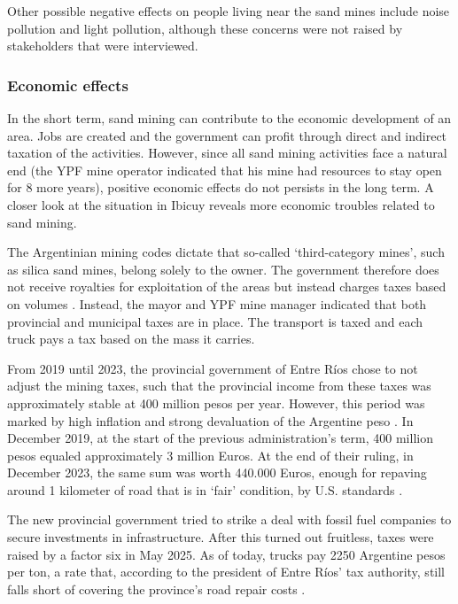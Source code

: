 Other possible negative effects on people living near the sand mines include noise pollution and light pollution, although these concerns were not raised by stakeholders that were interviewed.

\subsubsection{Economic effects}
In the short term, sand mining can contribute to the economic development of an area. Jobs are created and the government can profit through direct and indirect taxation of the activities. However, since all sand mining activities face a natural end (the YPF mine operator indicated that his mine had resources to stay open for 8 more years), positive economic effects do not persists in the long term. A closer look at the situation in Ibicuy reveals more economic troubles related to sand mining.

The Argentinian mining codes dictate that so-called `third-category mines', such as silica sand mines, belong solely to the owner. The government therefore does not receive royalties for exploitation of the areas but instead charges taxes based on volumes \autocite{novasImpactoAmbientalOculto2022}. Instead, the mayor and YPF mine manager indicated that both provincial and municipal taxes are in place. The transport is taxed and each truck pays a tax based on the mass it carries.

From 2019 until 2023, the provincial government of Entre Ríos chose to not adjust the mining taxes, such that the provincial income from these taxes was approximately stable at 400 million pesos per year. However, this period was marked by high inflation and strong devaluation of the Argentine peso \autocite{bellatoEntreRiosFrigerio2025}. In December 2019, at the start of the previous administration's term, 400 million pesos equaled approximately 3 million Euros. At the end of their ruling, in December 2023, the same sum was worth 440.000 Euros, enough for repaving around 1 kilometer of road that is in `fair' condition, by U.S. standards \autocite{crumbCostRoadMaintenance2024}. 

The new provincial government tried to strike a deal with fossil fuel companies to secure investments in infrastructure. After this turned out fruitless, taxes were raised by a factor six in May 2025. As of today, trucks pay 2250 Argentine pesos per ton, a rate that, according to the president of Entre Ríos’ tax authority, still falls short of covering the province’s road repair costs \autocite{crumbCostRoadMaintenance2024}. 

